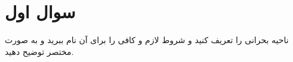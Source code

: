 \section{سوال اول}

ناحیه بحرانی را تعریف کنید و شروط لازم و کافی را برای آن نام ببرید و به صورت مختصر توضیح دهید.


\begin{qsolve}
	
\end{qsolve}




